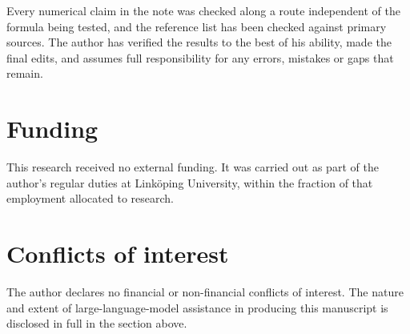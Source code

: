\documentclass[a4paper,11pt,oneside,reqno]{amsart}
\theoremstyle{definition}
\theoremstyle{remark}
\theoremstyle{plain}
\begin{document}
Every numerical claim in the note was checked along a route independent of the
formula being tested, and the reference list has been checked against primary
sources. The author has verified the results to the best of his ability, made
the final edits, and assumes full responsibility for any errors, mistakes or
gaps that remain.

\section*{Funding}

This research received no external funding. It was carried out as part of the
author's regular duties at Linköping University, within the fraction of that
employment allocated to research.

\section*{Conflicts of interest}

The author declares no financial or non-financial conflicts of interest. The
nature and extent of large-language-model assistance in producing this
manuscript is disclosed in full in the section above.
\end{document}
